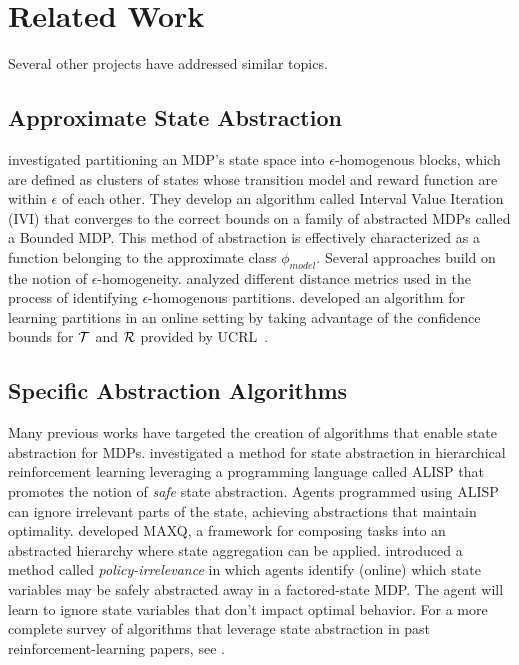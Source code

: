 \section{Related Work}

Several other projects have addressed similar topics.

\subsection{Approximate State Abstraction}
\citet{dean1997model} investigated partitioning an \ac{MDP}'s state space into $\epsilon$-homogenous blocks, which are defined as clusters of states whose transition model and reward function are within $\epsilon$ of each other. They develop an algorithm called Interval Value Iteration (IVI) that converges to the correct bounds on a family of abstracted MDPs called a Bounded MDP. This method of abstraction is effectively characterized as a function belonging to the approximate class $\phi_{model}$.
Several approaches build on the notion of $\epsilon$-homogeneity. \citet{even2003approximate} analyzed different distance metrics used in the process of identifying $\epsilon$-homogenous partitions. \citet{ortner2013adaptive} developed an algorithm for learning partitions in an online setting by taking advantage of the confidence bounds for $\mathcal{T}$ and $\mathcal{R}$ provided by UCRL~\cite{auer2009near}.

\subsection{Specific Abstraction Algorithms}
Many previous works have targeted the creation of algorithms that enable state abstraction for MDPs. \citet{andre2002state} investigated a method for state abstraction in hierarchical reinforcement learning leveraging a programming language called ALISP that promotes the notion of {\it safe} state abstraction. Agents programmed using ALISP can ignore irrelevant parts of the state, achieving abstractions that maintain optimality. \citet{dietterich2000hierarchical} developed MAXQ, a framework for composing tasks into an abstracted hierarchy where state aggregation can be applied. \citet{jong2005state} introduced a method called {\it policy-irrelevance} in which agents identify (online) which state variables may be safely abstracted away in a factored-state \ac{MDP}. The agent will learn to ignore state variables that don't impact optimal behavior. For a more complete survey of algorithms that leverage state abstraction in past reinforcement-learning papers, see \citet{li2006towards}.

